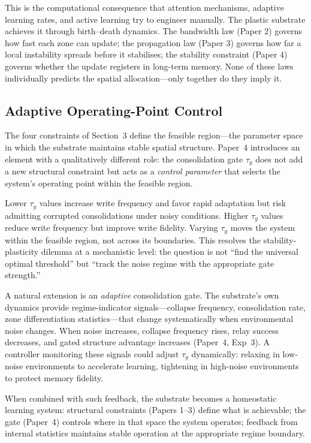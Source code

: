 \documentclass[11pt]{article}
\begin{document}
This is the computational consequence that attention mechanisms, adaptive learning rates, and active learning try to engineer manually. The plastic substrate achieves it through birth--death dynamics. The bandwidth law (Paper 2) governs how fast each zone can update; the propagation law (Paper 3) governs how far a local instability spreads before it stabilises; the stability constraint (Paper 4) governs whether the update registers in long-term memory. None of these laws individually predicts the spatial allocation---only together do they imply it.

\subsection{Adaptive Operating-Point Control}
\label{sec:homeostasis}

The four constraints of Section~3 define the feasible region---the parameter space in which the substrate maintains stable spatial structure. Paper~4 introduces an element with a qualitatively different role: the consolidation gate $\tau_g$ does not add a new structural constraint but acts as a \emph{control parameter} that selects the system's operating point within the feasible region.

Lower $\tau_g$ values increase write frequency and favor rapid adaptation but risk admitting corrupted consolidations under noisy conditions. Higher $\tau_g$ values reduce write frequency but improve write fidelity. Varying $\tau_g$ moves the system within the feasible region, not across its boundaries. This resolves the stability-plasticity dilemma at a mechanistic level: the question is not ``find the universal optimal threshold'' but ``track the noise regime with the appropriate gate strength.''

A natural extension is an \emph{adaptive} consolidation gate. The substrate's own dynamics provide regime-indicator signals---collapse frequency, consolidation rate, zone differentiation statistics---that change systematically when environmental noise changes. When noise increases, collapse frequency rises, relay success decreases, and gated structure advantage increases (Paper~4, Exp~3). A controller monitoring these signals could adjust $\tau_g$ dynamically: relaxing in low-noise environments to accelerate learning, tightening in high-noise environments to protect memory fidelity.

When combined with such feedback, the substrate becomes a homeostatic learning system: structural constraints (Papers 1--3) define what is achievable; the gate (Paper~4) controls where in that space the system operates; feedback from internal statistics maintains stable operation at the appropriate regime boundary.
\end{document}
